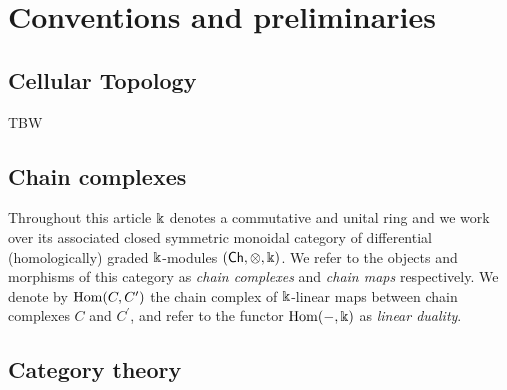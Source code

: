 
\section{Conventions and preliminaries} \label{s:preliminaries}


\subsection{Cellular Topology}

TBW

\subsection{Chain complexes}

Throughout this article $\Bbbk$ denotes a commutative and unital ring and we work over its associated closed symmetric monoidal category of differential (homologically) graded $\Bbbk$-modules $(\mathsf{Ch}, \otimes, \Bbbk)$.
We refer to the objects and morphisms of this category as \textit{chain complexes} and \textit{chain maps} respectively. We denote by $\mathrm{Hom}(C, C^\prime)$ the chain complex of $\Bbbk$-linear maps between chain complexes $C$ and $C^\prime$, and refer to the functor $\mathrm{Hom}(-, \Bbbk)$ as \textit{linear duality}.

\subsection{Category theory}

